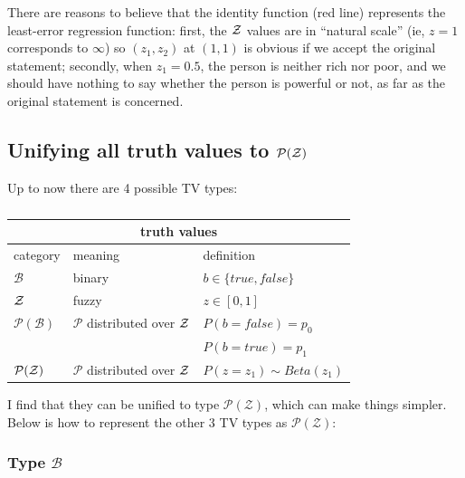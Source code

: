 There are reasons to believe that the identity function (red line) represents the least-error regression function:  first, the $\mathcal{Z}$ values are in ``natural scale'' (ie, $z=1$ corresponds to $\infty$) so $(z_1,z_2)$ at $(1,1)$ is obvious if we accept the original statement;  secondly, when $z_1 = 0.5$, the person is neither rich nor poor, and we should have nothing to say whether the person is powerful or not, as far as the original statement is concerned.

\underconst

\subsection{Unifying all truth values to $\mathcal{P(Z)}$}
\label{sec:unifying-P(Z)}

Up to now there are 4 possible TV types:
\begin{table}[H]
\parbox{3cm}{\caption{}}
\begin{tabular}{|l|l|l|} \hline
\multicolumn{3}{|c|}{\textbf{truth values}}\\ \hline
category                   & meaning                                      & definition \\ \hline
$\mathcal{B}$              & binary                                       & $b \in \{true, false\} $\\
$\mathcal{Z}$              & fuzzy                                        & $z \in [0,1] $\\
$\mathcal{P}(\mathcal{B})$ & $\mathcal{P}$ distributed over $\mathcal{Z}$ & $ P(b=false) = p_0 $\\
                           &                                              & $ P(b=true) = p_1 $\\
$\mathcal{P}(\mathcal{Z})$ & $\mathcal{P}$ distributed over $\mathcal{Z}$ & $ P(z=z_1) \sim Beta(z_1) $\\ \hline
\end{tabular}
\end{table}
I find that they can be unified to type $\mathcal{P(Z)}$, which can make things simpler.  Below is how to represent the other 3 TV types as $\mathcal{P(Z)}$:

\subsubsection{Type $\mathcal{B}$}

